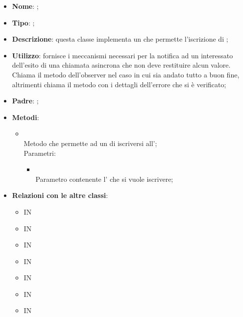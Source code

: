 \begin{itemize}
	\item \textbf{Nome}: ;
	\item \textbf{Tipo}: ;
	\item \textbf{Descrizione}: questa classe implementa un  che permette l'iscrizione di ;
	\item \textbf{Utilizzo}: fornisce i meccanismi necessari per la notifica ad un  interessato dell'esito di una chiamata asincrona che non deve restituire alcun valore. Chiama il metodo  dell'observer nel caso in cui sia andato tutto a buon fine, altrimenti chiama il metodo  con i dettagli dell'errore che si è verificato;
	\item \textbf{Padre}: ;
	\item \textbf{Metodi}:
	\begin{itemize}
		\item[]  \\		Metodo che permette ad un  di iscriversi all';\\
		Parametri:
		\begin{itemize}
			\item {} \\
			Parametro contenente l' che si vuole iscrivere;
		\end{itemize}
	\end{itemize}
	\item \textbf{Relazioni con le altre classi}:
	\begin{itemize}
		\item IN \hyperlink{<<interface>> ConversationsDAO_label}{}
		\item IN \hyperlink{ConversationsDAODynamoDB_label}{}
		\item IN \hyperlink{<<interface>> GuestsDAO_label}{}
		\item IN \hyperlink{GuestsDAODynamoDB_label}{}
		\item IN \hyperlink{<<interface>> MembersDAO_label}{}
		\item IN \hyperlink{MembersDAOSlack_label}{}
		\item IN \hyperlink{<<interface>> RulesDAO_label}{}

\end{itemize}
\end{itemize}
